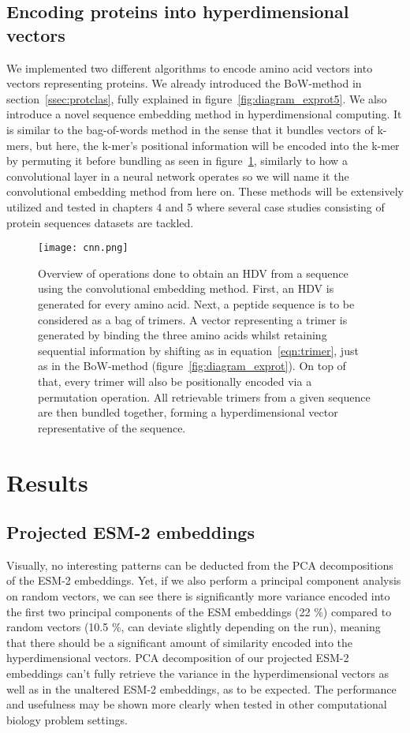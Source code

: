 \subsection*{Encoding proteins into hyperdimensional vectors}\label{ssec:protseq}
We implemented two different algorithms to encode amino acid vectors into vectors representing proteins. We already introduced the BoW-method in section~\ref{ssec:protclas}, fully explained in figure~\ref{fig:diagram_exprot5}. We also introduce a novel sequence embedding method in hyperdimensional computing.  It is similar to the bag-of-words method in the sense that it bundles vectors of k-mers, but here, the k-mer's positional information will be encoded into the k-mer by permuting it before bundling as seen in figure~\ref{fig:cnn}, similarly to how a convolutional layer in a neural network operates so we will name it the convolutional embedding method from here on. These methods will be extensively utilized and tested in chapters 4 and 5 where several case studies consisting of protein sequences datasets are tackled.

\begin{figure}[h]
    \centering
    \texttt{[image: cnn.png]}
    \caption{Overview of operations done to obtain an HDV from a sequence using the convolutional embedding method. First, an HDV is generated for every amino acid. Next, a peptide sequence is to be considered as a bag of trimers. A vector representing a trimer is generated by binding the three amino acids whilst retaining sequential information by shifting as in equation~\ref{eqn:trimer}, just as in the BoW-method (figure~\ref{fig:diagram_exprot}). On top of that, every trimer will also be positionally encoded via a permutation operation. All retrievable trimers from a given sequence are then bundled together, forming a hyperdimensional vector representative of the sequence.}\label{fig:cnn}
\end{figure}

\section{Results}
\subsection*{Projected ESM-2 embeddings}
Visually, no interesting patterns can be deducted from the PCA decompositions of the ESM-2 embeddings. Yet, if we also perform a principal component analysis on random vectors, we can see there is significantly more variance encoded into the first two principal components of the ESM embeddings (22 \%) compared to random vectors (10.5 \%, can deviate slightly depending on the run), meaning that there should be a significant amount of similarity encoded into the hyperdimensional vectors. PCA decomposition of our projected ESM-2 embeddings can't fully retrieve the variance in the hyperdimensional vectors as well as in the unaltered ESM-2 embeddings, as to be expected. The performance and usefulness may be shown more clearly when tested in other computational biology problem settings.

